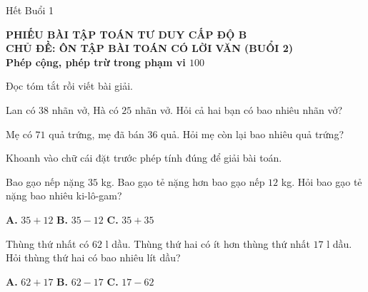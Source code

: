 \documentclass[../main.tex]{subfiles}
\begin{document}
\begin{center}
       \faGg\faGg\quad Hết Buổi 1 \quad\faGg\faGg
\end{center}

\newpage
\TTdatlaibai
\par\medskip
{\centering
        {\color{mauchinh!120}\bfseries\Large PHIẾU BÀI TẬP TOÁN TƯ DUY CẤP ĐỘ B}\\[3pt]
        {\color{mauchinh!120}\bfseries\Large CHỦ ĐỀ: ÔN TẬP BÀI TOÁN CÓ LỜI VĂN (BUỔI 2)}\\[2pt]
        {\color{mauchinh!120}\bfseries\large Phép cộng, phép trừ trong phạm vi $100$}\par}
\vspace{6pt}
\TTthongtin

\begin{bt}
    Đọc tóm tắt rồi viết bài giải.
    \begin{listEX}
        \item Lan có $38$ nhãn vở, Hà có $25$ nhãn vở. Hỏi cả hai bạn có bao nhiêu nhãn vở?
        \item Mẹ có $71$ quả trứng, mẹ đã bán $36$ quả. Hỏi mẹ còn lại bao nhiêu quả trứng?
    \end{listEX}
\end{bt}

\begin{bt}
    Khoanh vào chữ cái đặt trước phép tính đúng để giải bài toán.
    \begin{listEX}
        \item Bao gạo nếp nặng $35$ kg. Bao gạo tẻ nặng hơn bao gạo nếp $12$ kg. Hỏi bao gạo tẻ nặng bao nhiêu ki-lô-gam?\par
        \textbf{A.} $35+12$ \hspace{1.2cm} \textbf{B.} $35-12$ \hspace{1.2cm} \textbf{C.} $35+35$
        \item Thùng thứ nhất có $62$ l dầu. Thùng thứ hai có ít hơn thùng thứ nhất $17$ l dầu. Hỏi thùng thứ hai có bao nhiêu lít dầu?\par
        \textbf{A.} $62+17$ \hspace{1.2cm} \textbf{B.} $62-17$ \hspace{1.2cm} \textbf{C.} $17-62$
    \end{listEX}
\end{bt}
\end{document}
